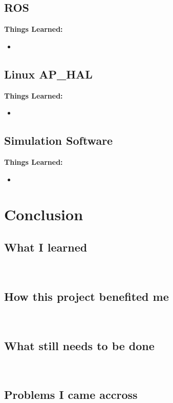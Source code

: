 \documentclass[letterpaper,10pt,notitlepage,fleqn]{article}
\begin{document}
\subsection{ROS}
\indent
\textbf{Things Learned:}
\begin{itemize} 
        \item
    \end{itemize}

\subsection{Linux AP\_HAL}
\indent
\textbf{Things Learned:}
\begin{itemize} 
        \item
    \end{itemize}

\subsection{Simulation Software}
\indent
\textbf{Things Learned:}
\begin{itemize} 
        \item
    \end{itemize}

\section{Conclusion}
\subsection{What I learned}
\indent
\\
\subsection{How this project benefited me}
\indent
\\
\subsection{What still needs to be done}
\indent
\\ 
\subsection{Problems I came accross}
\indent
\end{document}

